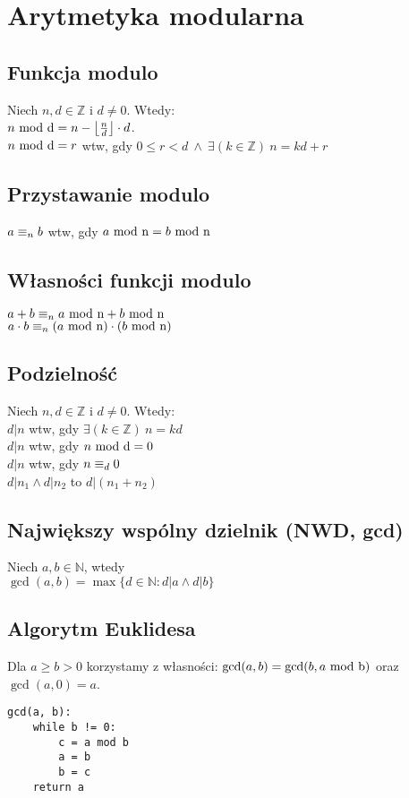 \section{Arytmetyka modularna}

\subsection*{Funkcja modulo}
Niech $n, d \in \mathbb{Z}$ i $d \neq 0$. Wtedy: \\
$n \ \mathrm{mod\ d} = n - \left\lfloor \frac{n}{d} \right\rfloor \cdot d$. \\

$n \ \mathrm{mod\ d} = r$ wtw, gdy ${0 \leq r < d} \ \wedge \ {\exists (k \in \mathbb{Z})} \ {n = kd + r}$

\subsection*{Przystawanie modulo}
$a \equiv_{n} b$ wtw, gdy $a \ \mathrm{mod\ n} = b \ \mathrm{mod\ n}$

\subsection*{Własności funkcji modulo}
$a + b \equiv_{n} a \ \mathrm{mod\ n} + b \ \mathrm{mod\ n}$ \\
$a \cdot b \equiv_{n} (a \ \mathrm{mod\ n}) \cdot (b \ \mathrm{mod\ n})$

\subsection*{Podzielność}
Niech $n, d \in \mathbb{Z}$ i $d \neq 0$. Wtedy: \\
$d | n$ wtw, gdy $\exists (k \in \mathbb{Z}) \ n = kd$ \\
$d | n$ wtw, gdy $n \ \mathrm{mod\ d} = 0$ \\
$d | n$ wtw, gdy $n \equiv_{d} 0$ \\
$d | n_1 \wedge d | n_2$ to $d | (n_1 + n_2)$

\subsection*{Największy wspólny dzielnik (NWD, gcd)}
Niech $a, b \in \mathbb{N}$, wtedy \\
$\gcd(a,b) = \max \{ d \in \mathbb{N} : d|a \wedge d|b \}$

\subsection*{Algorytm Euklidesa}
Dla $a \geq b > 0$ korzystamy z własności:
$\gcd(a,b) = \gcd(b, a \ \mathrm{mod\ b})$ oraz $\gcd(a, 0) = a$.
\begin{lstlisting}[style=code]
gcd(a, b):
    while b != 0:
        c = a mod b
        a = b
        b = c
    return a
\end{lstlisting}

